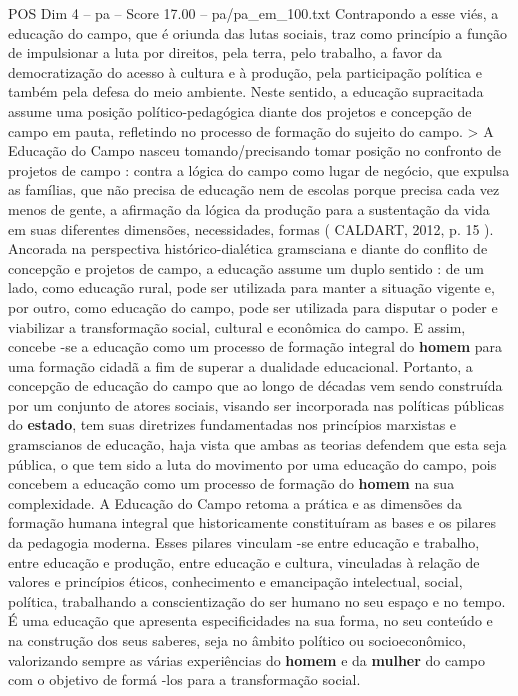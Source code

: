 \begin{textsample}{POS Dim 4 – pa – Score 17.00 – pa/pa\_em\_100.txt}
Contrapondo a esse viés, a educação do campo, que é oriunda das lutas sociais, traz como princípio a função de impulsionar a luta por direitos, pela terra, pelo trabalho, a favor da democratização do acesso à cultura e à produção, pela participação política e também pela defesa do meio ambiente.
Neste sentido, a educação supracitada assume uma posição político-pedagógica diante dos projetos e concepção de campo em pauta, refletindo no processo de formação do sujeito do campo. > A Educação do Campo nasceu tomando/precisando tomar posição no confronto de projetos de campo : contra a lógica do campo como lugar de negócio, que expulsa as famílias, que não precisa de educação nem de escolas porque precisa cada vez menos de gente, a afirmação da lógica da produção para a sustentação da vida em suas diferentes dimensões, necessidades, formas ( CALDART, 2012, p. 15 ).
Ancorada na perspectiva histórico-dialética gramsciana e diante do conflito de concepção e projetos de campo, a educação assume um duplo sentido : de um lado, como educação rural, pode ser utilizada para manter a situação vigente e, por outro, como educação do campo, pode ser utilizada para disputar o poder e viabilizar a transformação social, cultural e econômica do campo.
E assim, concebe -se a educação como um processo de formação integral do \textbf{homem} para uma formação cidadã a fim de superar a dualidade educacional.
Portanto, a concepção de educação do campo que ao longo de décadas vem sendo construída por um conjunto de atores sociais, visando ser incorporada nas políticas públicas do \textbf{estado}, tem suas diretrizes fundamentadas nos princípios marxistas e gramscianos de educação, haja vista que ambas as teorias defendem que esta seja pública, o que tem sido a luta do movimento por uma educação do campo, pois concebem a educação como um processo de formação do \textbf{homem} na sua complexidade.
A Educação do Campo retoma a prática e as dimensões da formação humana integral que historicamente constituíram as bases e os pilares da pedagogia moderna.
Esses pilares vinculam -se entre educação e trabalho, entre educação e produção, entre educação e cultura, vinculadas à relação de valores e princípios éticos, conhecimento e emancipação intelectual, social, política, trabalhando a conscientização do ser humano no seu espaço e no tempo.
É uma educação que apresenta especificidades na sua forma, no seu conteúdo e na construção dos seus saberes, seja no âmbito político ou socioeconômico, valorizando sempre as várias experiências do \textbf{homem} e da \textbf{mulher} do campo com o objetivo de formá -los para a transformação social.

\end{textsample}
